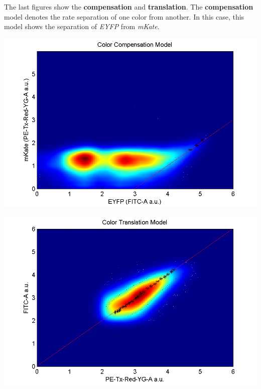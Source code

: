 The last figures show the \textbf{compensation} and \textbf{translation}. The \textbf{compensation} model denotes the rate separation of one color from another. In this case, this model shows the separation of \textit{EYFP} from \textit{mKate}.  

\begin{center}
  \includegraphics[width=.90\textwidth]{figures/color-compensation-mKate-for-EYFP}
\end{center}


\begin{center}
  \includegraphics[width=.90\textwidth]{figures/color-translation-mKate-to-EYFP}
\end{center}

  